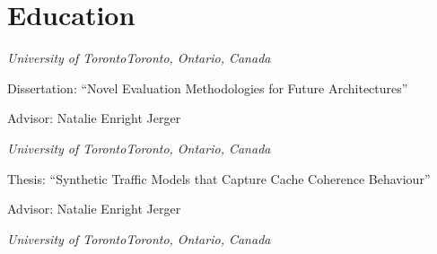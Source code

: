 \section{\sc Education}

{\textit{University of Toronto}}{\textit{Toronto, Ontario, Canada}}
{
  Dissertation: ``Novel Evaluation Methodologies for Future Architectures''

  Advisor:  Natalie Enright Jerger
}
\vspace{-0.4em}

{\textit{University of Toronto}}{\textit{Toronto, Ontario, Canada}}
{
  Thesis: ``Synthetic Traffic Models that Capture Cache Coherence Behaviour''

  Advisor:  Natalie Enright Jerger
}
\vspace{-0.4em}

{\textit{University of Toronto}}{\textit{Toronto, Ontario, Canada}}{}
